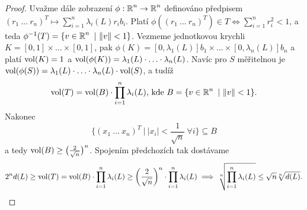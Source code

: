 \begin{proof}
Uvažme dále zobrazení $\phi: \operatorname{\mathbb{R}}^n \rightarrow \operatorname{\mathbb{R}}^n$ definováno předpisem $(r_1 \ \ldots \ r_n)^T \mapsto \sum_{i=1}^n \lambda_i(L) r_i b_i$. Platí $\phi((r_1 \ \ldots \ r_n)^T) \in T \iff \sum_{i=1}^n r_i^2 <1$, a teda $\phi^{-1}(T) = \{v \in \Real^n \ | \ \|v\| < 1\}$. Vezmeme jednotkovou krychli $K = [0,1] \times \ldots \times [0,1]$, pak $\phi(K) = [0,\lambda_1(L)]b_1 \times \ldots \times [0,\lambda_n(L)]b_n$ a platí $\operatorname{vol}(K) = 1$ a $\operatorname{vol}(\phi(K)) = \lambda_1(L)\cdot\ldots\cdot\lambda_n(L)$. Navíc pro $S$ měřitelnou je $\operatorname{vol}(\phi(S)) = \lambda_1(L)\cdot\ldots\cdot\lambda_n(L)\cdot\operatorname{vol}(S)$, a tudíž $$\vol(T) = \vol(B)\cdot\prod_{i=1}^n\lambda_i(L)\text{, kde }B = \{v \in \Real^n \ | \ \|v\| < 1\}.$$Nakonec $$\bigg\{(x_1 \ \ldots \ x_n)^T \ | \ |x_i| < \frac{1}{\sqrt{n}} \ \forall i\bigg\} \subseteq B$$
a tedy $\operatorname{vol}(B) \geq \big(\frac{2}{\sqrt{n}}\big)^n$. Spojením předchozích tak dostávame $$2^nd(L) \geq \operatorname{vol}(T) = \operatorname{vol}(B)\cdot\prod_{i=1}^n\lambda_i(L) \geq \bigg(\frac{2}{\sqrt{n}}\bigg)^n\cdot\prod_{i=1}^n\lambda_i(L) \implies \sqrt[n]{\prod_{i=1}^n \lambda_i(L)} \leq \sqrt{n}\sqrt[n]{d(L)}.$$
\end{proof}
